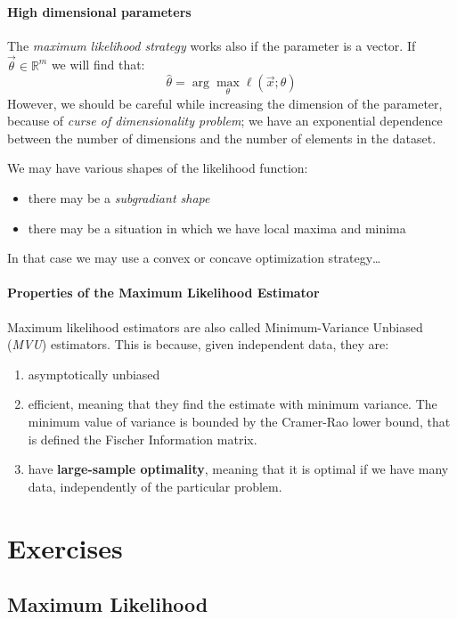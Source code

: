 \paragraph*{High dimensional parameters}
The \textit{maximum likelihood strategy} works also if the parameter is a vector. If $\vec{\theta} \in \mathbb{R}^m$ we will find that:
\[
    \hat{\theta} = \arg\max_{\theta }  \ell(\vec{x}; \theta)
\]
However, we should be careful while increasing the dimension of the parameter, because of \textit{curse of dimensionality problem}; we have an exponential dependence between the number of dimensions and the number of elements in the dataset.

We may have various shapes of the likelihood function:
\begin{itemize}
    \item there may be a \textit{subgradiant shape}
    \item there may be a situation in which we have local maxima and minima
\end{itemize}
In that case we may use a convex or concave optimization strategy\dots
\paragraph*{Properties of the Maximum Likelihood Estimator}
Maximum likelihood estimators are also called Minimum-Variance Unbiased (\textit{MVU}) estimators. This is because, given independent data, they are:
\begin{enumerate}
    \item asymptotically unbiased
    \item efficient, meaning that they find the estimate with minimum variance. The minimum value of variance is bounded by the Cramer-Rao lower bound, that is defined the Fischer Information matrix.
    \item have \textbf{large-sample optimality}, meaning that it is optimal if we have many data, independently of the particular problem.
\end{enumerate}

\section{Exercises}
\subsection{Maximum Likelihood}
